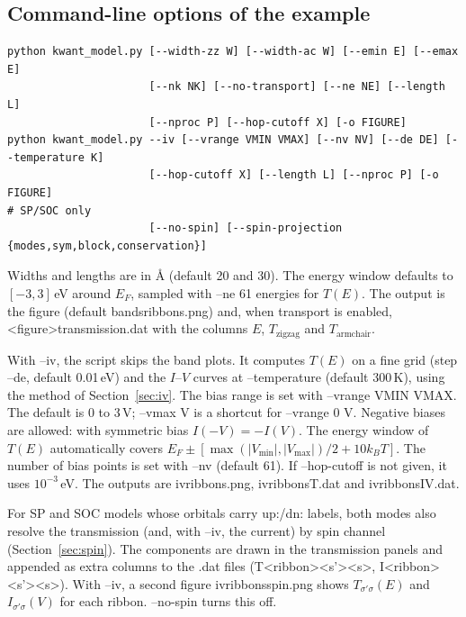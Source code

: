 \documentclass[11pt,a4paper]{article}
\newcommand{\code}[1]{{\ttfamily\def\_{\textunderscore\allowbreak}\def\slash{/\allowbreak}#1}}
\begin{document}
\subsection{Command-line options of the example}
\begin{lstlisting}
python kwant_model.py [--width-zz W] [--width-ac W] [--emin E] [--emax E]
                      [--nk NK] [--no-transport] [--ne NE] [--length L]
                      [--nproc P] [--hop-cutoff X] [-o FIGURE]
python kwant_model.py --iv [--vrange VMIN VMAX] [--nv NV] [--de DE] [--temperature K]
                      [--hop-cutoff X] [--length L] [--nproc P] [-o FIGURE]
# SP/SOC only
                      [--no-spin] [--spin-projection {modes,sym,block,conservation}]
\end{lstlisting}
Widths and lengths are in \AA{} (default 20 and 30). The energy window defaults to
$[-3, 3]$\,eV around $E_F$, sampled with \code{--ne} 61 energies for $T(E)$. The output
is the figure (default \code{bands\_ribbons.png}) and, when transport is enabled,
\code{<figure>\_transmission.dat} with the columns $E$, $T_\text{zigzag}$ and
$T_\text{armchair}$.

With \code{--iv}, the script skips the band plots. It computes $T(E)$ on a fine grid
(step \code{--de}, default 0.01\,eV) and the $I$--$V$ curves at \code{--temperature}
(default 300\,K), using the method of Section~\ref{sec:iv}. The bias range is set with
\code{--vrange VMIN VMAX}. The default is 0 to 3\,V; \code{--vmax V} is a shortcut for
\code{--vrange 0 V}. Negative biases are allowed: with symmetric bias $I(-V)=-I(V)$. The
energy window of $T(E)$ automatically covers
$E_F \pm [\max(|V_\text{min}|,|V_\text{max}|)/2 + 10k_BT]$. The number of bias points is
set with \code{--nv} (default 61). If \code{--hop-cutoff} is not given, it uses $10^{-3}$\,eV. The
outputs are \code{iv\_ribbons.png}, \code{iv\_ribbons\_T.dat} and \code{iv\_ribbons\_IV.dat}.

For SP and SOC models whose orbitals carry \code{up:}/\code{dn:} labels, both modes also
resolve the transmission (and, with \code{--iv}, the current) by spin channel
(Section~\ref{sec:spin}). The components are drawn in the transmission panels and appended
as extra columns to the \code{.dat} files (\code{T\_<ribbon>\_<s'><s>}, \code{I\_<ribbon>\_<s'><s>}).
With \code{--iv}, a second figure \code{iv\_ribbons\_spin.png} shows $T_{\sigma'\sigma}(E)$ and
$I_{\sigma'\sigma}(V)$ for each ribbon. \code{--no-spin} turns this off.
\end{document}
